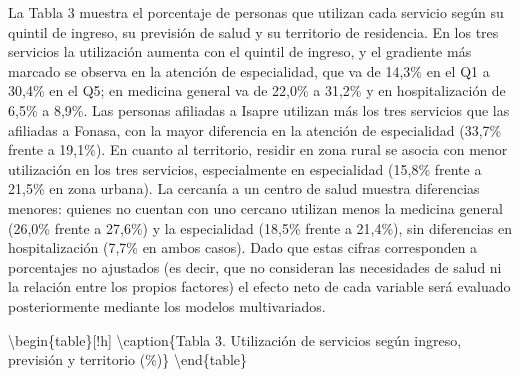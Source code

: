 \documentclass[
  spanish,
  a4paper,
  oneside]{scrbook}
\begin{document}
La Tabla 3 muestra el porcentaje de personas que utilizan cada servicio
según su quintil de ingreso, su previsión de salud y su territorio de
residencia. En los tres servicios la utilización aumenta con el quintil
de ingreso, y el gradiente más marcado se observa en la atención de
especialidad, que va de 14,3\% en el Q1 a 30,4\% en el Q5; en medicina
general va de 22,0\% a 31,2\% y en hospitalización de 6,5\% a 8,9\%. Las
personas afiliadas a Isapre utilizan más los tres servicios que las
afiliadas a Fonasa, con la mayor diferencia en la atención de
especialidad (33,7\% frente a 19,1\%). En cuanto al territorio, residir
en zona rural se asocia con menor utilización en los tres servicios,
especialmente en especialidad (15,8\% frente a 21,5\% en zona urbana).
La cercanía a un centro de salud muestra diferencias menores: quienes no
cuentan con uno cercano utilizan menos la medicina general (26,0\%
frente a 27,6\%) y la especialidad (18,5\% frente a 21,4\%), sin
diferencias en hospitalización (7,7\% en ambos casos). Dado que estas
cifras corresponden a porcentajes no ajustados (es decir, que no
consideran las necesidades de salud ni la relación entre los propios
factores) el efecto neto de cada variable será evaluado posteriormente
mediante los modelos multivariados.

\textbackslash begin\{table\}{[}!h{]} \centering
\textbackslash caption\{\label{tab:unnamed-chunk-4}Tabla 3. Utilización
de servicios según ingreso, previsión y territorio (\%)\} \centering
{} \textbackslash end\{table\}
\end{document}
